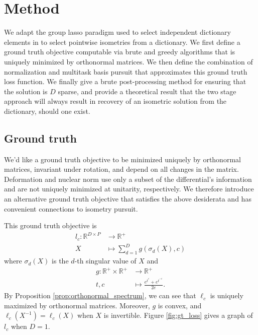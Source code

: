 \section{Method}

We adapt the group lasso paradigm used to select independent dictionary elements in \citet{Koelle2022-ju, Koelle2024-no} to select pointwise isometries from a dictionary.
We first define a ground truth objective computable via brute and greedy algorithms that is uniquely minimized by orthonormal matrices.
We then define the combination of normalization and multitask basis pursuit that approximates this ground truth loss function.
We finally give a brute post-processing method for ensuring that the solution is $D$ sparse, and provide a theoretical result that the two stage approach will always result in recovery of an isometric solution from the dictionary, should one exist.

\subsection{Ground truth}
\label{sec:ground_truth}

We'd like a ground truth objective to be minimized uniquely by orthonormal matrices, invariant under rotation, and depend on all changes in the matrix.
Deformation \citep{Kohli2021-lr} and nuclear norm \citep{Boyd2004-ql} use only a subset of the differential's information and are not uniquely minimized at unitarity, respectively.
We therefore introduce an alternative ground truth objective that satisfies the above desiderata and has convenient connections to isometry pursuit.

This ground truth objective is
\begin{align}
l_{c}: \mathbb R^{D \times P} &\to \mathbb R^{+} \\
X &\mapsto \sum_{d = 1}^D g(\sigma_d( X), c)
\end{align}
where $\sigma_d ( X)$ is the $d$-th singular value of $ X$ and
\begin{align}
g: \mathbb R^+ \times \mathbb R^+ &\to \mathbb R^+ \\
t,c &\mapsto \frac{e^{t^c} + e^{t^{-c}}}{2e}.
\end{align}
By Proposition \ref{prop:orthonormal_spectrum}, we can see that $\ell_c$ is uniquely maximized by orthonormal matrices.
Moreover, $g$ is convex, and $\ell_c( X^{-1}) = \ell_c( X)$ when $X$ is invertible.
Figure \ref{fig:gt_loss} gives a graph of $l_c$ when $D=1$.



